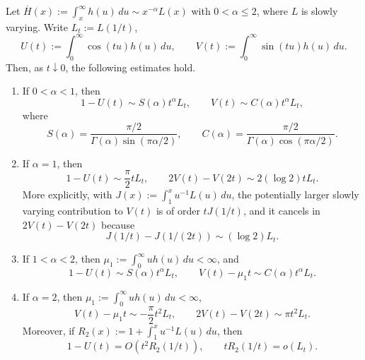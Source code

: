 \documentclass[aap,press]{apt} \volno{00} \partno{00}
\newcommand{\1}{\mathbf{1}}
\numberwithin{equation}{section}
\begin{document}
\begin{lem}\label{lem:small-frequency-abelian-estimates}
Let $\overline H(x):=\int_x^\infty h(u)\,du\sim x^{-\alpha}L(x)$ with $0<\alpha\le2$, where $L$ is slowly varying. Write $L_t:=L(1/t)$,
\[
U(t):=\int_0^\infty \cos(tu)h(u)\,du,
\qquad
V(t):=\int_0^\infty \sin(tu)h(u)\,du.
\]
Then, as $t\downarrow0$, the following estimates hold.
\begin{enumerate}
\item If $0<\alpha<1$, then
\[
1-U(t)\sim S(\alpha)t^\alpha L_t,
\qquad
V(t)\sim C(\alpha)t^\alpha L_t,
\]
where
\[
S(\alpha)=\frac{\pi/2}{\Gamma(\alpha)\sin(\pi\alpha/2)},
\qquad
C(\alpha)=\frac{\pi/2}{\Gamma(\alpha)\cos(\pi\alpha/2)}.
\]
\item If $\alpha=1$, then
\[
1-U(t)\sim \frac{\pi}{2}tL_t,
\qquad
2V(t)-V(2t)\sim 2(\log2)tL_t.
\]
More explicitly, with $J(x):=\int_1^x u^{-1}L(u)\,du$, the potentially larger slowly varying contribution to $V(t)$ is of order $tJ(1/t)$, and it cancels in $2V(t)-V(2t)$ because
\[
J(1/t)-J(1/(2t))\sim (\log2)L_t.
\]
\item If $1<\alpha<2$, then $\mu_1:=\int_0^\infty u h(u)\,du<\infty$, and
\[
1-U(t)\sim S(\alpha)t^\alpha L_t,
\qquad
V(t)-\mu_1t\sim C(\alpha)t^\alpha L_t.
\]
\item If $\alpha=2$, then $\mu_1:=\int_0^\infty u h(u)\,du<\infty$,
\[
V(t)-\mu_1t\sim -\frac{\pi}{2}t^2L_t,
\qquad
2V(t)-V(2t)\sim \pi t^2L_t.
\]
Moreover, if $R_2(x):=1+\int_1^x u^{-1}L(u)\,du$, then
\[
1-U(t)=O(t^2R_2(1/t)),
\qquad
 tR_2(1/t)=o(L_t).
\]
\end{enumerate}
\end{lem}
\end{document}

